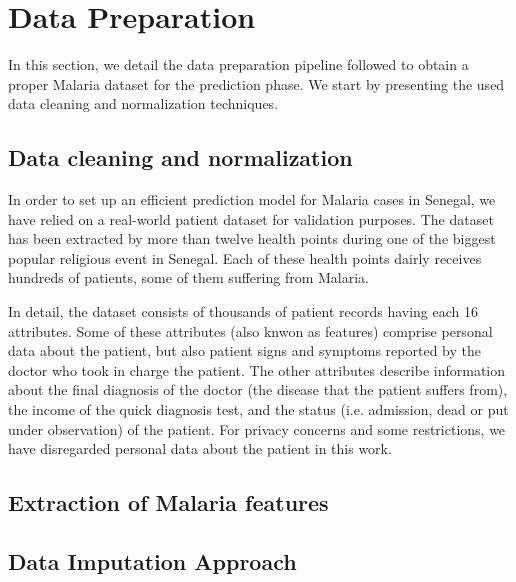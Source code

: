 \section{Data Preparation}\label{data_prep}
In this section, we detail the data preparation pipeline followed to obtain a proper Malaria dataset for the prediction phase.
We start by presenting the used data cleaning and normalization techniques.


\subsection{Data cleaning and normalization}
In order to set up an efficient prediction model for Malaria cases in Senegal, we have relied on a real-world patient dataset
for validation purposes. The dataset has been extracted by more than twelve health points during one of the biggest 
popular religious event in Senegal. Each of these health points dairly receives hundreds of patients, some of them 
suffering from Malaria. 

In detail, the dataset consists of thousands of patient records having each 16 attributes. Some of these
attributes (also knwon as features) comprise personal data about the patient, but also patient signs and symptoms
reported by the doctor who took in charge the patient. The other attributes describe information about the final diagnosis
of the doctor (the disease that the patient suffers from), the income of the quick diagnosis test, and the status (i.e. admission, 
dead or put under observation) of the patient. For privacy concerns and some restrictions, we have disregarded personal data about
the patient in this work. 

\subsection{Extraction of Malaria features}


\subsection{Data Imputation Approach} 
